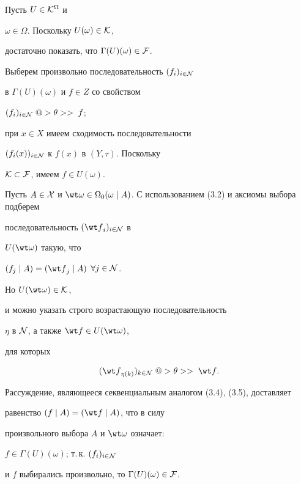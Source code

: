 \begin{pf}


Пусть $U \in {{\cal K}^{\Omega}}$ и


$\omega \in \Omega$. Поскольку ${U(\omega)} \in {\cal K}$,


достаточно показать, что ${{\Gamma}(U)}(\omega) \in {\cal F}$.


Выберем произвольно последовательность $(f_i)_{i \in {\cal N}}$


в ${\Gamma}(U)(\omega)$ и $f \in Z$ со свойством


${{(f_i)_{i \in {\cal N}}}\;@>{\theta}>>\;f}$;


при $x \in X$ имеем сходимость последовательности


$({f_i}(x))_{i \in {\cal N}}$ к $f(x)$ в $(Y,\tau)$. Поскольку


${\cal K} \subset {\cal F}$, имеем $f \in {U(\omega)}$.


Пусть $A \in {\cal X}$ и ${\wt \omega} \in {{\Omega}_0}(\omega \mid


A)$. С использованием (3.2) и аксиомы выбора подберем


последовательность $({\wt f}_i)_{i \in {\cal N}}$ в


$U(\wt \omega)$ такую, что 


$({f_j}\mid A) = ({{\wt f}_j}\mid A)$ $\forall{j} \in {\cal N}$.


Но $U(\wt \omega) \in {\cal K}$,


и можно указать строго возрастающую последовательность


$\eta$ в ${\cal N}$, а также ${\wt f} \in {U(\wt \omega)}$,


для которых


$$


{({\wt f}_{{\eta}(k)})_{k \in {\cal N}}}\;@>{\theta}>>\;{\wt f}.


$$


Рассуждение, являющееся секвенциальным аналогом (3.4), (3.5), доставляет


равенство $(f \mid A) = ({\wt f} \mid A)$, что в силу


произвольного выбора $A$ и $\wt \omega$ означает:


$f \in {{\Gamma}(U)(\omega)}$; т.\,к. $(f_i)_{i \in {\cal N}}$


и $f$ выбирались произвольно, то ${{\Gamma}(U)(\omega)} \in


{\cal F}$.


\end{pf}





